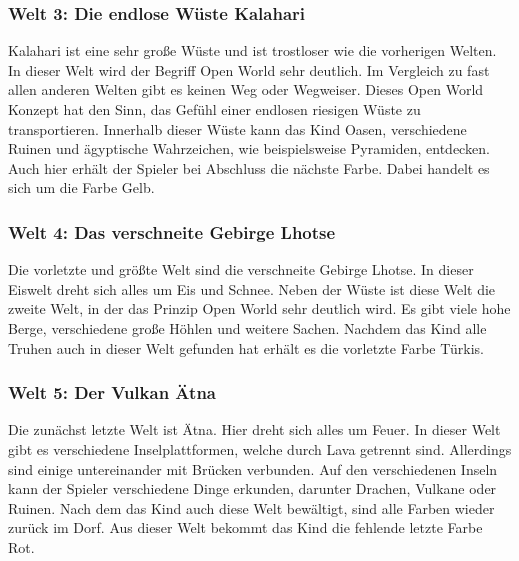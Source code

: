 \subsubsection{Welt 3: Die endlose Wüste Kalahari}
	Kalahari ist eine sehr große Wüste und ist trostloser wie die vorherigen Welten. In dieser Welt wird der Begriff Open World sehr deutlich. Im Vergleich zu fast allen anderen Welten gibt es keinen Weg oder Wegweiser. Dieses Open World Konzept hat den Sinn, das Gefühl einer endlosen riesigen Wüste zu transportieren. Innerhalb dieser Wüste kann das Kind Oasen, verschiedene Ruinen und ägyptische Wahrzeichen, wie beispielsweise Pyramiden, entdecken. Auch hier erhält der Spieler bei Abschluss die nächste Farbe. Dabei handelt es sich um die Farbe Gelb.
	
\subsubsection{Welt 4: Das verschneite Gebirge Lhotse}
	Die vorletzte und größte Welt sind die verschneite Gebirge Lhotse. In dieser Eiswelt dreht sich alles um Eis und Schnee. Neben der Wüste ist diese Welt die zweite Welt, in der das Prinzip Open World sehr deutlich wird. Es gibt viele hohe Berge, verschiedene große Höhlen und weitere Sachen. Nachdem das Kind alle Truhen auch in dieser Welt gefunden hat erhält es die vorletzte Farbe Türkis.
	
\subsubsection{Welt 5: Der Vulkan Ätna}
	Die zunächst letzte Welt ist Ätna. Hier dreht sich alles um Feuer. In dieser Welt gibt es verschiedene Inselplattformen, welche durch Lava getrennt sind. Allerdings sind einige untereinander mit Brücken verbunden. Auf den verschiedenen Inseln kann der Spieler verschiedene Dinge erkunden, darunter Drachen, Vulkane oder Ruinen. Nach dem das Kind auch diese Welt bewältigt, sind alle Farben wieder zurück im Dorf. Aus dieser Welt bekommt das Kind die fehlende letzte Farbe Rot.
